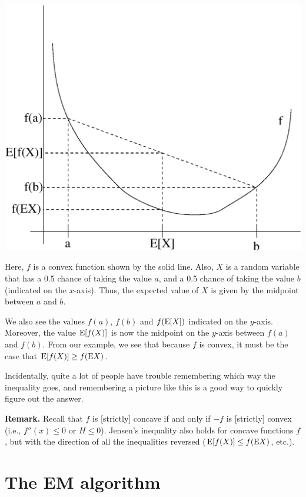 \documentclass{article}
\begin{document}
\begin{center}
\includegraphics[scale=0.5]{jensen.eps}
\end{center}

Here, $f$ is a convex function shown by the solid line.  Also, $X$
is a random variable that has a 0.5 chance of taking the value $a$,
and a 0.5 chance of taking the value $b$ (indicated on the $x$-axis).
Thus, the expected value of $X$ is given by the midpoint
between $a$ and $b$.

We also see the values $f(a)$, $f(b)$ and $f({\rm E}[X])$ indicated
on the $y$-axis.  Moreover, the value ${\rm E}[f(X)]$ is now
the midpoint on the $y$-axis between $f(a)$ and $f(b)$.  From
our example, we see that because $f$ is convex, it must be
the case that ${\rm E}[f(X)] \geq f({\rm E} X)$.

Incidentally, quite a lot of people have trouble remembering which
way the inequality goes, and remembering a picture like this is
a good way to quickly figure out the answer.

\noindent
{\bf Remark.} Recall that $f$ is [strictly] concave if and only if $-f$ is
[strictly] convex (i.e., $f''(x) \leq 0$ or $H \leq 0$). Jensen's
inequality also holds for concave functions $f$, but with the direction
of all the inequalities reversed (${\rm E}[f(X)] \leq f({\rm E} X)$, etc.).



\section{The EM algorithm}
\end{document}
